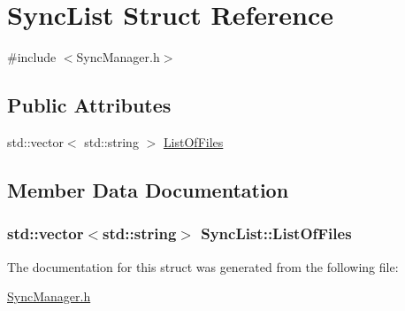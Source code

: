 \hypertarget{structSyncList}{\section{Sync\-List Struct Reference}
\label{structSyncList}
}


{\ttfamily \#include $<$Sync\-Manager.\-h$>$}

\subsection*{Public Attributes}
\begin{DoxyCompactItemize}
\item 
std\-::vector$<$ std\-::string $>$ \hyperlink{structSyncList_a50a5c986d11ed11d9eda1f9bd04cc4a7}{List\-Of\-Files}
\end{DoxyCompactItemize}


\subsection{Member Data Documentation}
\hypertarget{structSyncList_a50a5c986d11ed11d9eda1f9bd04cc4a7}{
\subsubsection[{List\-Of\-Files}]{\setlength{\rightskip}{0pt plus 5cm}std\-::vector$<$std\-::string$>$ Sync\-List\-::\-List\-Of\-Files}}\label{structSyncList_a50a5c986d11ed11d9eda1f9bd04cc4a7}


The documentation for this struct was generated from the following file\-:\begin{DoxyCompactItemize}
\item 
\hyperlink{SyncManager_8h}{Sync\-Manager.\-h}\end{DoxyCompactItemize}

